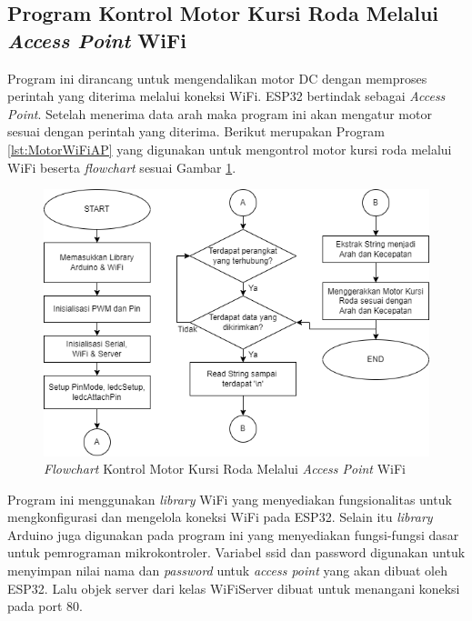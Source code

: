 \subsection{Program Kontrol Motor Kursi Roda Melalui \emph{Access Point} WiFi}

Program ini dirancang untuk mengendalikan motor DC dengan memproses perintah yang diterima melalui koneksi WiFi. ESP32 bertindak sebagai \emph{Access Point}. Setelah menerima data arah maka program ini akan mengatur motor sesuai dengan perintah yang diterima. Berikut merupakan Program \ref{lst:MotorWiFiAP} yang digunakan untuk mengontrol motor kursi roda melalui WiFi beserta \emph{flowchart} sesuai Gambar \ref{fig:Flowchart 8 Kontrol WiFi}.

\begin{figure} [ht] \centering
  \includegraphics[scale=0.7]{gambar/program/8. Kontrol Motor WiFi.png}
  \caption{\emph{Flowchart} Kontrol Motor Kursi Roda Melalui \emph{Access Point} WiFi}
  \label{fig:Flowchart 8 Kontrol WiFi}
\end{figure}

Program ini menggunakan \emph{library} WiFi yang menyediakan fungsionalitas untuk mengkonfigurasi dan mengelola koneksi WiFi pada ESP32. Selain itu \emph{library} Arduino juga digunakan pada program ini yang menyediakan fungsi-fungsi dasar untuk pemrograman mikrokontroler. Variabel ssid dan password digunakan untuk menyimpan nilai nama dan \emph{password} untuk \emph{access point} yang akan dibuat oleh ESP32. Lalu objek server dari kelas WiFiServer dibuat untuk menangani koneksi pada port 80.


